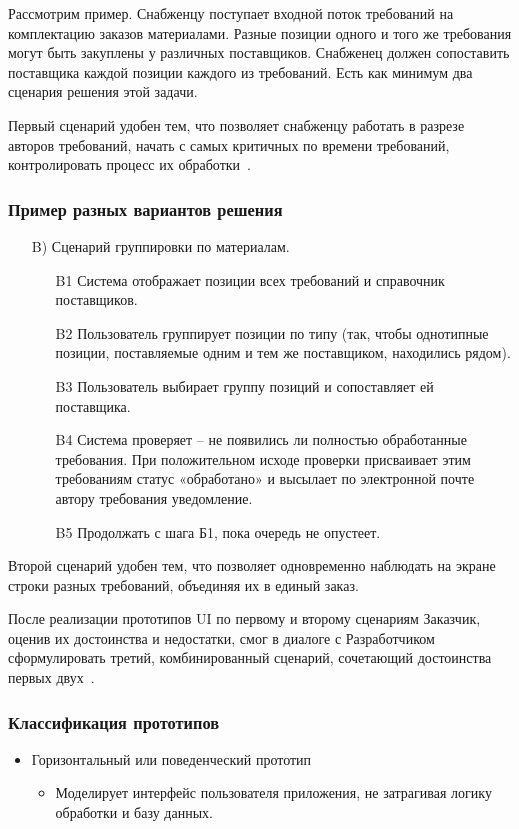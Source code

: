 \documentclass{../industrial-development}
\begin{document}
{\lecturenotes

Рассмотрим пример. Снабженцу поступает входной поток требований на комплектацию заказов материалами. Разные позиции одного и того же требования могут быть закуплены у различных поставщиков. Снабженец должен сопоставить поставщика каждой позиции каждого из требований. Есть как минимум два сценария решения этой задачи.

Первый сценарий удобен тем, что позволяет снабженцу работать в разрезе авторов требований, начать с самых критичных по времени требований, контролировать процесс
их обработки~\cite[с.~53]{Maglinec}.

\begin{frame} \frametitle {Пример разных вариантов решения}
\begin{itemize}
\item[B)] Сценарий группировки по материалам.
\begin{itemize}
\item[B1] Система отображает позиции всех требований и справочник поставщиков.
\item[B2] Пользователь группирует позиции по типу (так, чтобы однотипные позиции,
поставляемые одним и тем же поставщиком, находились рядом).
\item[B3] Пользователь выбирает группу позиций и сопоставляет ей поставщика.
\item[B4] Система проверяет – не появились ли полностью обработанные требования.
При положительном исходе проверки присваивает этим требованиям статус «обработано»
и высылает по электронной почте автору требования уведомление.
\item[B5] Продолжать с шага Б1, пока очередь не опустеет.
\end{itemize}
\end{itemize}
\end{frame}

\lecturenotes

Второй сценарий удобен тем, что позволяет одновременно наблюдать на
экране строки разных требований, объединяя их в единый заказ.

После реализации прототипов UI по первому и второму сценариям Заказчик,
оценив их достоинства и недостатки, смог в диалоге с Разработчиком сформулировать
третий, комбинированный сценарий, сочетающий достоинства первых двух~\cite[с.~53]{Maglinec}.


\begin{frame} \frametitle {Классификация прототипов}
\begin{itemize}
\item \alert{Горизонтальный или поведенческий прототип} 
\begin{itemize}
 \item Моделирует интерфейс пользователя приложения, не затрагивая логику
обработки и базу данных.
\end{itemize}


\end{itemize}
\end{frame}}
\end{document}
